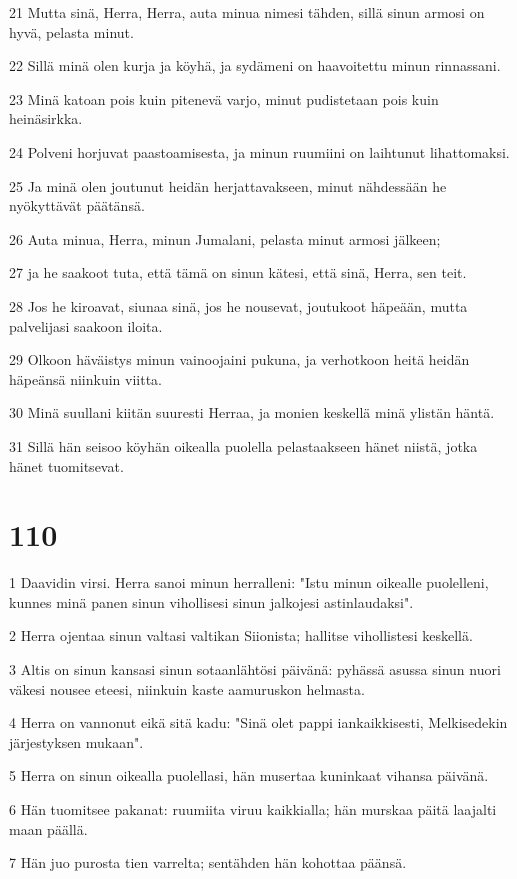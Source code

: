 \par 21 Mutta sinä, Herra, Herra, auta minua nimesi tähden, sillä sinun armosi on hyvä, pelasta minut.
\par 22 Sillä minä olen kurja ja köyhä, ja sydämeni on haavoitettu minun rinnassani.
\par 23 Minä katoan pois kuin pitenevä varjo, minut pudistetaan pois kuin heinäsirkka.
\par 24 Polveni horjuvat paastoamisesta, ja minun ruumiini on laihtunut lihattomaksi.
\par 25 Ja minä olen joutunut heidän herjattavakseen, minut nähdessään he nyökyttävät päätänsä.
\par 26 Auta minua, Herra, minun Jumalani, pelasta minut armosi jälkeen;
\par 27 ja he saakoot tuta, että tämä on sinun kätesi, että sinä, Herra, sen teit.
\par 28 Jos he kiroavat, siunaa sinä, jos he nousevat, joutukoot häpeään, mutta palvelijasi saakoon iloita.
\par 29 Olkoon häväistys minun vainoojaini pukuna, ja verhotkoon heitä heidän häpeänsä niinkuin viitta.
\par 30 Minä suullani kiitän suuresti Herraa, ja monien keskellä minä ylistän häntä.
\par 31 Sillä hän seisoo köyhän oikealla puolella pelastaakseen hänet niistä, jotka hänet tuomitsevat.

\chapter{110}

\par 1 Daavidin virsi. Herra sanoi minun herralleni: "Istu minun oikealle puolelleni, kunnes minä panen sinun vihollisesi sinun jalkojesi astinlaudaksi".
\par 2 Herra ojentaa sinun valtasi valtikan Siionista; hallitse vihollistesi keskellä.
\par 3 Altis on sinun kansasi sinun sotaanlähtösi päivänä: pyhässä asussa sinun nuori väkesi nousee eteesi, niinkuin kaste aamuruskon helmasta.
\par 4 Herra on vannonut eikä sitä kadu: "Sinä olet pappi iankaikkisesti, Melkisedekin järjestyksen mukaan".
\par 5 Herra on sinun oikealla puolellasi, hän musertaa kuninkaat vihansa päivänä.
\par 6 Hän tuomitsee pakanat: ruumiita viruu kaikkialla; hän murskaa päitä laajalti maan päällä.
\par 7 Hän juo purosta tien varrelta; sentähden hän kohottaa päänsä.


